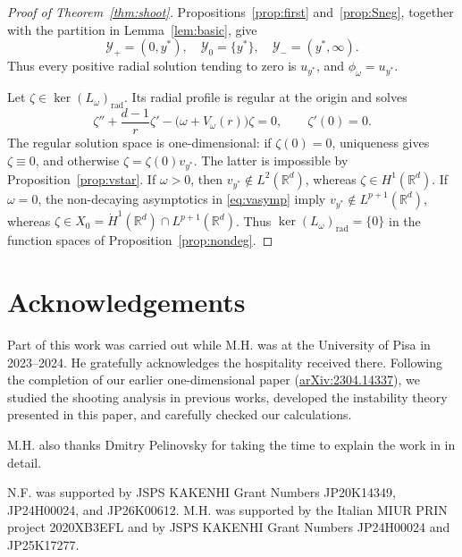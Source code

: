 \documentclass[12pt, a4paper, reqno]{amsart}
\numberwithin{equation}{section}
\theoremstyle{definition}
\theoremstyle{remark}
\newcommand{\R}{\mathbb R}
\newcommand{\rad}{\mathrm{rad}}
\begin{document}
\begin{proof}[Proof of Theorem~\ref{thm:shoot}]
Propositions~\ref{prop:first} and~\ref{prop:Sneg}, together with the
partition in Lemma~\ref{lem:basic}, give
\[
  \mathcal Y_+=(0,y^*),
  \quad
  \mathcal Y_0=\{y^*\},
  \quad
  \mathcal Y_-=(y^*,\infty).
\]
Thus every positive radial solution tending to zero is $u_{y^*}$, and
$\phi_\omega=u_{y^*}$.

Let $\zeta\in\ker(L_\omega)_{\rad}$. Its radial profile is regular at the
origin and solves
\[
  \zeta''+\frac{d-1}{r}\zeta'
  -\bigl(\omega+V_\omega(r)\bigr)\zeta=0,
  \qquad
  \zeta'(0)=0.
\]
The regular solution space is one-dimensional: if $\zeta(0)=0$, uniqueness
gives $\zeta\equiv0$, and otherwise $\zeta=\zeta(0)v_{y^*}$. The latter is
impossible by Proposition~\ref{prop:vstar}. If $\omega>0$, then
$v_{y^*}\notin L^2(\R^d)$, whereas $\zeta\in H^1(\R^d)$.
If $\omega=0$, the non-decaying asymptotics in \eqref{eq:vasymp}
imply $v_{y^*}\notin L^{p+1}(\R^d)$, whereas
$\zeta\in X_0=\dot H^1(\R^d)\cap L^{p+1}(\R^d)$.
Thus $\ker(L_\omega)_{\rad}=\{0\}$ in the function spaces of
Proposition~\ref{prop:nondeg}.
\end{proof}



\begingroup
\small
\section*{Acknowledgements}

Part of this work was carried out while M.H. was at the
University of Pisa in 2023--2024. He gratefully acknowledges
the hospitality received there.
Following the completion of our earlier one-dimensional paper \cite{FH25}
(\href{https://arxiv.org/abs/2304.14337}{arXiv:2304.14337}),
we studied the shooting analysis in previous works, developed the instability theory presented in this paper, and carefully checked our calculations.

M.H. also thanks Dmitry Pelinovsky for taking the time to
explain the work in \cite{HHP24} in detail.

N.F. was supported by JSPS KAKENHI Grant Numbers JP20K14349, JP24H00024, and JP26K00612. M.H. was supported by the Italian MIUR PRIN project 2020XB3EFL and by JSPS KAKENHI Grant Numbers JP24H00024 and JP25K17277.

\par
\endgroup

\end{document}
